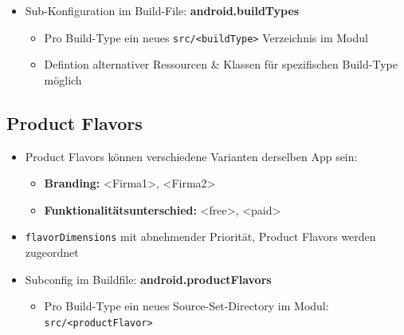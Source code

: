 \documentclass[a4paper]{article}
\begin{document}
{\begin{itemize}
\begin{itemize}
			\item Setzen des "debuggable"-Flags
			
			\item Unterschiedliche \texttt{applicationId} und \texttt{versionName}\\
			Ermöglicht die parallele Installation von Release- und Debug-Version
			
		\end{itemize}
	
		\item Sub-Konfiguration im Build-File: \textbf{android.buildTypes}
		
		\begin{itemize}
			
			\item Pro Build-Type ein neues \texttt{src/<buildType>} Verzeichnis im Modul
			
			\item Defintion alternativer Ressourcen \& Klassen für spezifischen Build-Type möglich
			
		\end{itemize}
		
	\end{itemize}

	\subsection{Product Flavors}
	
	\begin{itemize}
		
		\item Product Flavors können verschiedene Varianten derselben App sein:
		
		\begin{itemize}
			\item \textbf{Branding:} <Firma1>, <Firma2>
			\item \textbf{Funktionalitätsunterschied:} <free>, <paid>
		\end{itemize}
	
		\item \texttt{flavorDimensions} mit abnehmender Priorität, Product Flavors werden zugeordnet
		
		\item Subconfig im Buildfile: \textbf{android.productFlavors}
		
		\begin{itemize}
			
			\item Pro Build-Type ein neues Source-Set-Directory im Modul:\\
					\texttt{src/<productFlavor>}
					

\end{itemize}
\end{itemize}}
\end{document}
